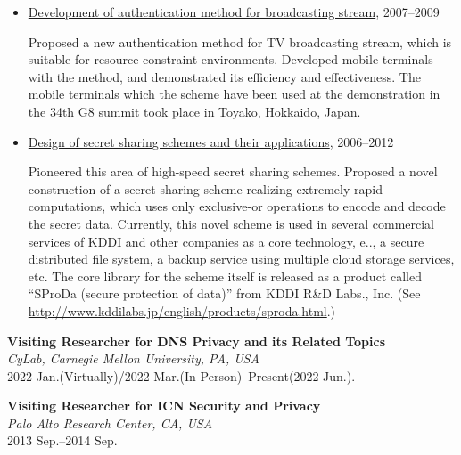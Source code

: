 \begin{itemize}
\item \hspace*{4ex}
\underline{Development of authentication method for broadcasting stream},
2007--2009\\[0.5ex]
\hspace*{6ex}
\begin{minipage}{0.9\linewidth}
Proposed a new authentication method for TV broadcasting stream, which is suitable for
resource constraint environments. Developed mobile terminals with the
 method, and demonstrated its efficiency and effectiveness.
The mobile terminals which the scheme have been used at the
 demonstration in the 34th G8 summit took place in Toyako, Hokkaido, Japan.
\end{minipage}

\item \hspace*{4ex}
\underline{Design of secret sharing schemes and their applications},
2006--2012\\[0.5ex]
\hspace*{6ex}
\begin{minipage}{0.9\linewidth}
Pioneered this area of high-speed secret sharing schemes. Proposed a
 novel construction of a secret sharing scheme realizing extremely rapid
 computations, which uses only exclusive-or operations to encode and
 decode the secret data.
Currently, this novel scheme is used in several commercial services of
 KDDI and other companies as a core technology,
 e.\@g.\@, a secure distributed file system, a backup
 service using multiple cloud storage services, etc.
The core library for the scheme itself is released as a product called ``SProDa (secure protection of data)'' from KDDI R\&D Labs., Inc. (See \href{http://www.kddilabs.jp/english/products/sproda.html}{http://www.kddilabs.jp/english/products/sproda.html}.)
\end{minipage}
\end{itemize}

\textbf{Visiting Researcher for DNS Privacy and its Related Topics}\\
\hspace*{4ex}\textit{CyLab, Carnegie Mellon University, PA, USA}\\
\hspace*{4ex} 2022 Jan.(Virtually)/2022 Mar.(In-Person)--Present(2022 Jun.).
\vspace{1ex}

\textbf{Visiting Researcher for ICN Security and Privacy}\\
\hspace*{4ex}\textit{Palo Alto Research Center, CA, USA}\\
\hspace*{4ex} 2013 Sep.--2014 Sep.



